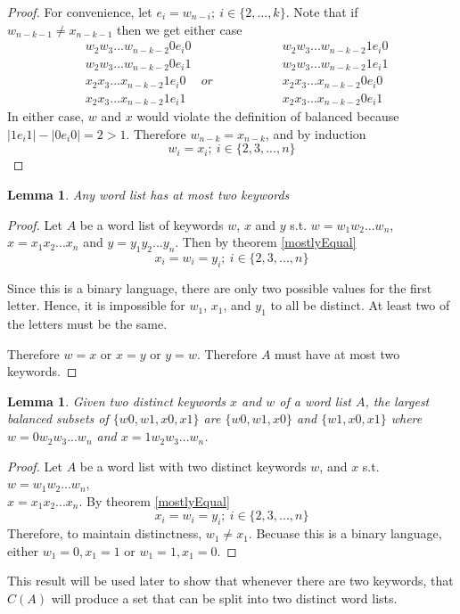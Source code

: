 \documentclass{article}
\newtheorem{lemma}[theorem]{Lemma}
\begin{document}
\begin{proof}
For convenience, let $e_i = w_{n-i};\ i \in \{2,...,k\}$. Note that if $w_{n-k-1} \neq x_{n-k-1}$ then we get either case
\begin{align*}
    &w_2w_3...w_{n-k-2}0e_i0 &               & w_2w_3...w_{n-k-2}1e_i0  \\
    &w_2w_3...w_{n-k-2}0e_i1 &               & w_2w_3...w_{n-k-2}1e_i1  \\
    &x_2x_3...x_{n-k-2}1e_i0 &or \hspace{2cm}& x_2x_3...x_{n-k-2}0e_i0  \\
    &x_2x_3...x_{n-k-2}1e_i1 &               & x_2x_3...x_{n-k-2}0e_i1 
\end{align*}
In either case, $w$ and $x$ would violate the definition of balanced because \\ $|1e_i1| - |0e_i0| = 2 > 1$. Therefore $w_{n-k} = x_{n-k}$, and by induction 
$$w_i = x_i;\ i \in \{2,3,...,n\}$$
\end{proof}

\begin{lemma}
    Any  word list has at most two keywords
\end{lemma}
\begin{proof}
    Let $A$ be a word list of keywords  $w$, $x$ and $y$ s.t. $w = w_1w_2...w_{n}$, \\ $x = x_1x_2...x_{n}$ and $y = y_1y_2...y_n$. Then by theorem \ref{mostlyEqual}
    $$x_i = w_i = y_i;\ i \in \{2, 3, ..., n\}$$

Since this is a binary language, there are only two possible values for the first letter. Hence, it is impossible for $w_1$, $x_1$, and $y_1$ to all be distinct. At least two of the letters must be the same.

Therefore $w = x$ or $x = y$ or $y = w$. Therefore $A$ must have at most two keywords.
\end{proof}

\begin{lemma}\label{01first}
    Given two distinct keywords $x$ and $w$ of  a word list $A$, the largest balanced subsets of $\{w0, w1, x0, x1 \}$ are $\{w0, w1, x0\}$ and $\{w1, x0, x1\}$ where $w = 0w_2w_3...w_n$ and $x = 1w_2w_3...w_n$.
\end{lemma}
\begin{proof}
    Let $A$ be a word list with two distinct keywords $w$, and $x$ s.t. $w = w_1w_2...w_{n}$, \\ $x = x_1x_2...x_{n}$. By theorem \ref{mostlyEqual} 
    $$x_i = w_i = y_i;\ i \in \{2, 3, ..., n\}$$
    Therefore, to maintain distinctness, $w_1 \ne x_1$. Becuase this is a binary language, either $w_1 = 0, x_1 = 1$ or $w_1 = 1, x_1 = 0$.
\end{proof}
This result will be used later to show that whenever there are two keywords, that $C(A)$ will produce a set that can be split into two distinct word lists.
\end{document}
